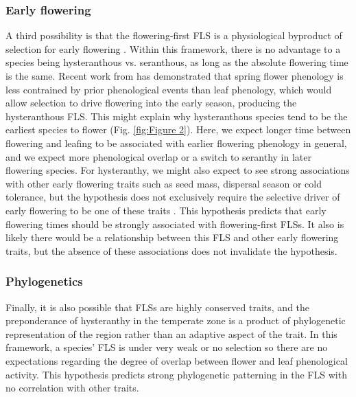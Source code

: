 \documentclass[12pt]{article}
\begin{document}
\subsubsection*{Early flowering}
\indent\indent A third possibility is that the flowering-first FLS is a physiological byproduct of selection for early flowering \citep{Primack1987}. Within this framework, there is no advantage to a species being hysteranthous vs. seranthous, as long as the absolute flowering time is the same. Recent work from \citet{Savage2019} has demonstrated that spring flower phenology is less contrained by prior phenological events than leaf phenology, which would allow selection to drive flowering into the early season, producing the hysteranthous FLS. This might explain why hysteranthous species tend to be the earliest species to flower (Fig. \ref{fig:Figure 2}). Here, we expect longer time between flowering and leafing to be associated with earlier flowering phenology in general, and we expect more phenological overlap or a switch to seranthy in later flowering species. For hysteranthy, we might also expect to see strong associations with other early flowering traits such as seed mass, dispersal season or cold tolerance, but the hypothesis does not exclusively require the selective driver of early flowering to be one of these traits \citep{Savage2019}. This hypothesis predicts that early flowering times should be strongly associated with flowering-first FLSs. It also is likely there would be a relationship between this FLS and other early flowering traits, but the absence of these associations does not invalidate the hypothesis.

\subsubsection*{Phylogenetics} 
\indent\indent Finally, it is also possible that FLSs are highly conserved traits, and the preponderance of hysteranthy in the temperate zone is a product of phylogenetic representation of the region rather than an adaptive aspect of the trait. In this framework, a species' FLS is under very weak or no selection so there are no expectations regarding the degree of overlap between flower and leaf phenological activity.  This hypothesis predicts strong phylogenetic patterning in the FLS with no correlation with other traits.\\
\end{document}
